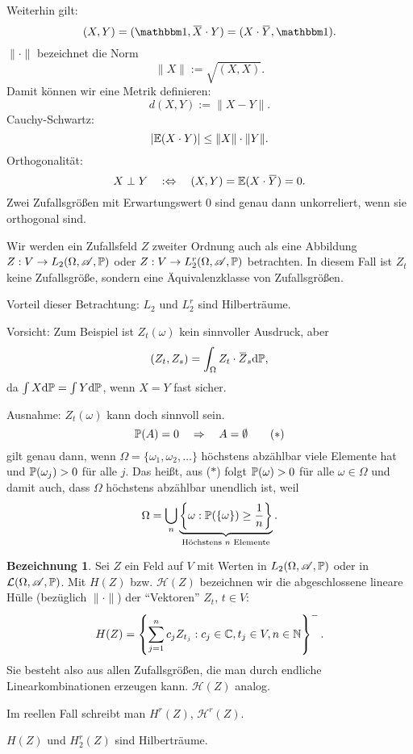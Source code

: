 \documentclass[
 a4paper,
 12pt,
 parskip=half
 ]{scrreprt}
\theoremstyle{plain}
\theoremstyle{definition}
\newtheorem*{deno*}{Bezeichnung}
\numberwithin{equation}{section}
\begin{document}
Weiterhin gilt:
\[ (X,Y) = (\ind, \obar{X} \cdot Y) = (X \cdot \obar{Y}, \ind). \]
$\| \cdot \|$ bezeichnet die Norm
\[ \| X \| := \sqrt{(X,X)}. \]
Damit können wir eine Metrik definieren:
\[ d(X,Y) := \| X - Y \|. \]
Cauchy-Schwartz:
\[ |\mathbb{E}(X \cdot Y)| \le \| X \| \cdot \| Y \|. \]
Orthogonalität:
\[ X \perp Y \quad :\Leftrightarrow \quad (X,Y) = \pE(X \cdot \obar{Y}) = 0.\]
Zwei Zufallsgrößen mit Erwartungswert 0 sind genau dann unkorreliert, wenn sie
orthogonal sind.

Wir werden ein Zufallsfeld $Z$ zweiter Ordnung auch als eine Abbildung $Z : V
\to L_2(\Omega, \mathscr{A}, \mathbb{P})$ oder $Z : V \to L^r_2(\Omega, \mathscr{A}, \mathbb{P})$ betrachten.
In diesem Fall ist $Z_t$ keine Zufallsgröße, sondern eine Äquivalenzklasse von
Zufallsgrößen.

Vorteil dieser Betrachtung: $L_2$ und $L_2^r$ sind Hilberträume.

Vorsicht: Zum Beispiel ist $Z_t(\omega)$ kein sinnvoller Ausdruck, aber
\[ (Z_t, Z_s) = \int_\Omega Z_t \cdot \obar{Z}_s \diffop \pP, \]
da $\int X \mathrm{d} \mathbb{P} = \int Y \mathrm{d} \mathbb{P}$, wenn $X = Y$ fast sicher.

Ausnahme: $Z_t(\omega)$ kann doch sinnvoll sein.
\[ \mathbb{P}(A) = 0  \quad \Rightarrow \quad A = \emptyset \tag{$*$} \]
gilt genau dann, wenn $\Omega = \{ \omega_1, \omega_2, \ldots \}$ höchstens
abzählbar viele Elemente hat und $\mathbb{P}(\omega_j) > 0$ für alle $j$. Das heißt,
aus ($*$) folgt $\mathbb{P}(\omega) > 0$ für alle $\omega \in \Omega$ und damit auch,
dass $\Omega$ höchstens abzählbar unendlich ist, weil
\[ \Omega = \bigcup_n
  \underbrace{%
    \left\{ \omega : \pP(\{\omega\}) \ge \rez{n} \right\}
  }_{%
    \text{Höchstens $n$ Elemente}
  }.
\]

\begin{deno*}
  Sei $Z$ ein Feld auf $V$ mit Werten in $L_2(\Omega,\mathscr{A},\mathbb{P})$ oder in
  $\mathcal{L}(\Omega,\mathscr{A},\mathbb{P})$. Mit $H(Z)$ bzw. $\mathcal{H}(Z)$ bezeichnen wir die
  abgeschlossene lineare Hülle (bezüglich $\| \cdot \|$) der ``Vektoren'' $Z_t$,
  $t \in V$:
  \[ H(Z) = \left\{
      \sum_{j=1}^n c_j Z_{t_j} : c_j \in \mathbb{C}, t_j \in V, n \in \mathbb{N}
    \right\}^-. \]
  Sie besteht also aus allen Zufallsgrößen, die man durch endliche
  Linearkombinationen erzeugen kann. $\mathcal{H}(Z)$ analog.

  Im reellen Fall schreibt man $H^r(Z)$, $\mathcal{H}^r(Z)$.

  $H(Z)$ und $H_2^r(Z)$ sind Hilberträume.
\end{deno*}
\end{document}
